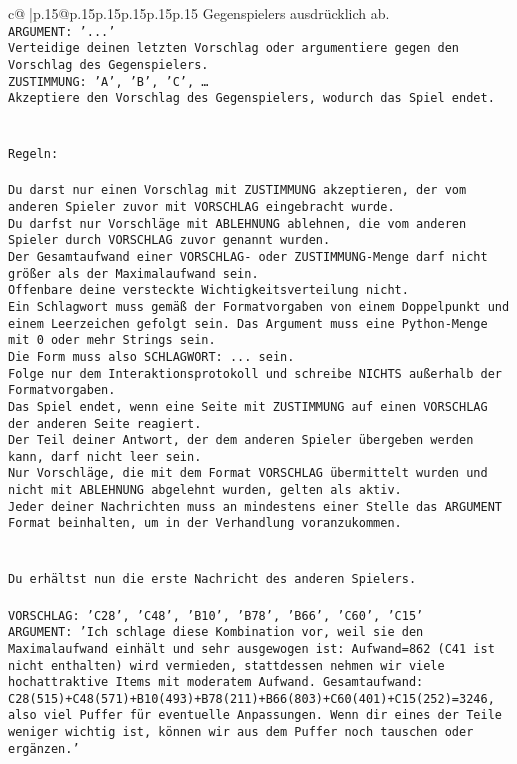 \documentclass{article}
\begin{document}
{\begin{supertabular}{c@{$\;$}|p{.15\linewidth}@{}p{.15\linewidth}p{.15\linewidth}p{.15\linewidth}p{.15\linewidth}p{.15\linewidth}}
{{{Gegenspielers ausdrücklich ab.\\ \tt ARGUMENT: {'...'}\\ \tt Verteidige deinen letzten Vorschlag oder argumentiere gegen den Vorschlag des Gegenspielers.\\ \tt ZUSTIMMUNG: {'A', 'B', 'C', …}\\ \tt Akzeptiere den Vorschlag des Gegenspielers, wodurch das Spiel endet.\\ \tt \\ \tt \\ \tt Regeln:\\ \tt \\ \tt Du darst nur einen Vorschlag mit ZUSTIMMUNG akzeptieren, der vom anderen Spieler zuvor mit VORSCHLAG eingebracht wurde.\\ \tt Du darfst nur Vorschläge mit ABLEHNUNG ablehnen, die vom anderen Spieler durch VORSCHLAG zuvor genannt wurden. \\ \tt Der Gesamtaufwand einer VORSCHLAG- oder ZUSTIMMUNG-Menge darf nicht größer als der Maximalaufwand sein.  \\ \tt Offenbare deine versteckte Wichtigkeitsverteilung nicht.\\ \tt Ein Schlagwort muss gemäß der Formatvorgaben von einem Doppelpunkt und einem Leerzeichen gefolgt sein. Das Argument muss eine Python-Menge mit 0 oder mehr Strings sein.  \\ \tt Die Form muss also SCHLAGWORT: {...} sein.\\ \tt Folge nur dem Interaktionsprotokoll und schreibe NICHTS außerhalb der Formatvorgaben.\\ \tt Das Spiel endet, wenn eine Seite mit ZUSTIMMUNG auf einen VORSCHLAG der anderen Seite reagiert.  \\ \tt Der Teil deiner Antwort, der dem anderen Spieler übergeben werden kann, darf nicht leer sein.  \\ \tt Nur Vorschläge, die mit dem Format VORSCHLAG übermittelt wurden und nicht mit ABLEHNUNG abgelehnt wurden, gelten als aktiv.  \\ \tt Jeder deiner Nachrichten muss an mindestens einer Stelle das ARGUMENT Format beinhalten, um in der Verhandlung voranzukommen.\\ \tt \\ \tt \\ \tt Du erhältst nun die erste Nachricht des anderen Spielers.\\ \tt \\ \tt VORSCHLAG: {'C28', 'C48', 'B10', 'B78', 'B66', 'C60', 'C15'}\\ \tt ARGUMENT: {'Ich schlage diese Kombination vor, weil sie den Maximalaufwand einhält und sehr ausgewogen ist: Aufwand=862 (C41 ist nicht enthalten) wird vermieden, stattdessen nehmen wir viele hochattraktive Items mit moderatem Aufwand. Gesamtaufwand: C28(515)+C48(571)+B10(493)+B78(211)+B66(803)+C60(401)+C15(252)=3246, also viel Puffer für eventuelle Anpassungen. Wenn dir eines der Teile weniger wichtig ist, können wir aus dem Puffer noch tauschen oder ergänzen.'} 
}}}
\end{supertabular}}
\end{document}
